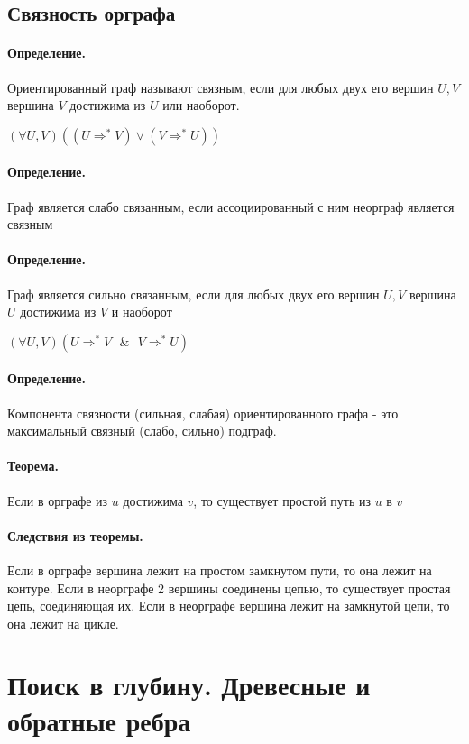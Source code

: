 \documentclass{report}
\newcommand{\band}{\mbox{ } \& \mbox{ }}
\newcommand{\pathto}[1][1]{ \Rightarrow^{*}_{#1} }
\begin{document}
\subsection{Связность орграфа}

\paragraph*{Определение.}
Ориентированный граф называют связным, если для любых двух его вершин $U, V$ вершина
$V$ достижима из  $U$ или наоборот.

$(\forall U,V)((U \Rightarrow^{*} V) \lor (V \pathto[] U))$

\paragraph*{Определение.}
Граф является слабо связанным, если ассоциированный с ним неорграф является связным

\paragraph*{Определение.}
Граф является сильно связанным, если для любых двух его вершин $U, V$ вершина  $U$ достижима
из  $V$ и наоборот

$(\forall U,V)(U \pathto[] V \band V \pathto[] U)$

\paragraph*{Определение.}
Компонента связности (сильная, слабая) ориентированного графа - это максимальный связный
(слабо, сильно) подграф.

\paragraph*{Теорема.}
Если в орграфе из $u$ достижима  $v$, то существует простой путь из  $u$ в  $v$

\paragraph*{Следствия из теоремы.}
Если в орграфе вершина лежит на простом замкнутом пути, то она лежит на контуре.
Если в неорграфе 2 вершины соединены цепью, то существует простая цепь, соединяющая их.
Если в неорграфе вершина лежит на замкнутой цепи, то она лежит на цикле.

\newpage

\section{Поиск в глубину. Древесные и обратные ребра}
\end{document}
